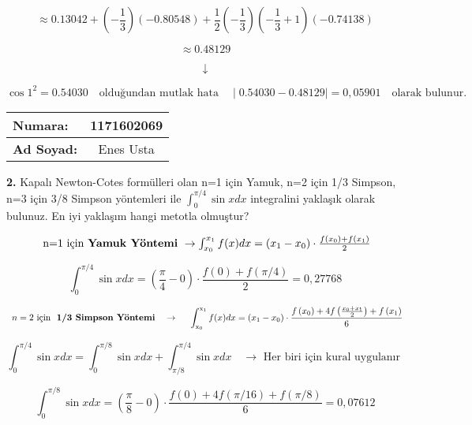 \documentclass[a4paper,10pt]{article}
\begin{document}
$$\approx 0.13042+\left(-\frac{1}{3}\right)(-0.80548)+\frac{1}{2}\left(-\frac{1}{3}\right)\left(-\frac{1}{3}+1\right)(-0.74138)$$

$$\approx 0.48129$$

$$\downarrow$$

$$\cos 1^{2}=0.54030 \quad \text{olduğundan mutlak hata} \quad \mid0.54030 - 0.48129\mid  = 0,05901 \quad \text{olarak bulunur.}$$

\vspace{1cm}

\pagebreak


  \begin{tabular}{ | l  c | }
    \hline
    \textbf{Numara:} & 1171602069 \\ \hline
    \textbf{Ad Soyad:} & Enes Usta \\
    \hline
  \end{tabular}

\vspace{1cm}

\textbf{2.} Kapalı Newton-Cotes formülleri olan n=1 için Yamuk, n=2 için 1/3 Simpson, n=3 için
3/8 Simpson yöntemleri ile $\int_{0}^{\pi / 4} \sin x d x$ integralini yaklaşık olarak bulunuz. En iyi
yaklaşım hangi metotla olmuştur?

$$\begin{array}{l}
\text { n=1 için \textbf{Yamuk Yöntemi} } \rightarrow \int_{x_{0}}^{x_{1}} f(x) d x=\left(x_{1}-x_{0}\right) \cdot \frac{f\left(x_{0}\right)+f\left(x_{1}\right)}{2} \\
\end{array}$$

$$\int_{0}^{\pi / 4} \sin x d x=\left(\frac{\pi}{4}-0\right) \cdot \frac{f(0)+f(\pi / 4)}{2}=0,27768$$

$$\begin{array}{l}
n=2 \text { için } \text { \textbf{1/3 Simpson Yöntemi}} \quad \rightarrow \\
\end{array} \quad \int_{\mathrm{x}_{0}}^{\mathrm{x}_{1}} f(x) d x=\left(x_{1}-x_{0}\right) \cdot \frac{f\left(x_{0}\right)+4 f\left(\frac{x_{0}+x_{1}}{2}\right)+f\left(x_{1}\right)}{6}$$

$$\int_{0}^{\pi / 4} \sin x d x=\int_{0}^{\pi / 8} \sin x d x+\int_{\pi / 8}^{\pi / 4} \sin x d x \quad \rightarrow \text { Her biri için kural uygulanır }$$

$$\int_{0}^{\pi / 8} \sin x d x=\left(\frac{\pi}{8}-0\right) \cdot \frac{f(0)+4 f(\pi / 16)+f(\pi / 8)}{6}=0,07612$$
\end{document}

